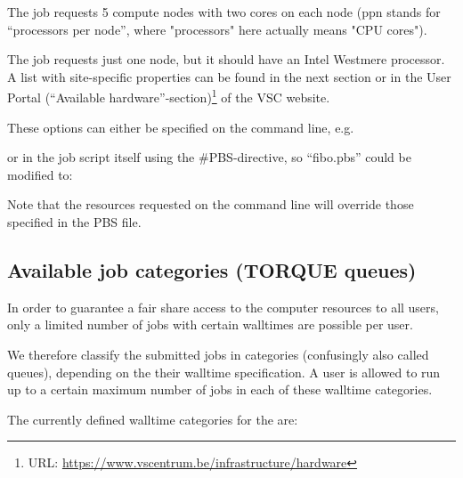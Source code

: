 \begin{prompt}
\end{prompt}

The job requests 5 compute nodes with two cores on each node (ppn stands for
``processors per node'', where "processors" here actually means "CPU cores"). \\

\begin{prompt}
\end{prompt}

The job requests just one node, but it should have an Intel Westmere processor.
A list with site-specific properties can be found in the next section or in the
User Portal
(``Available hardware''-section)\footnote{URL: \url{https://www.vscentrum.be/infrastructure/hardware}}
of the VSC website.

These options can either be specified on the command line, e.g.

\begin{prompt}
\end{prompt}

or in the job script itself using the \#PBS-directive, so ``fibo.pbs'' could be modified to:


Note that the resources requested on the command line will override those
specified in the PBS file.

\subsection{Available job categories (TORQUE queues)}

In order to guarantee a fair share access to the computer resources to all
users, only a limited number of jobs with certain walltimes are possible per
user.

We therefore classify the submitted jobs in categories (confusingly also called
queues), depending on the their walltime specification.  A user is allowed to
run up to a certain maximum number of jobs in each of these walltime
categories.

The currently defined walltime categories for the \hpc
are:



